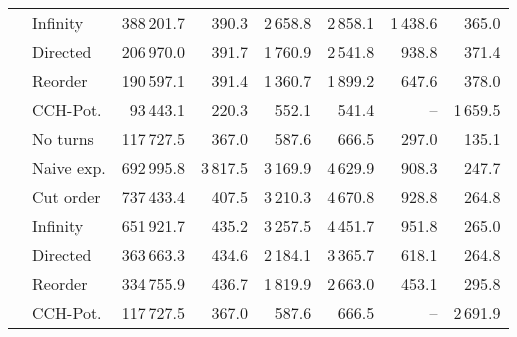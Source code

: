 \begin{tabular}{llrrrrrr}
       & Infinity &                 388\,201.7 &           390.3 &                                     2\,658.8 &                                       2\,858.1 & 1\,438.6 &  365.0 \\
       & Directed &                 206\,970.0 &           391.7 &                                     1\,760.9 &                                       2\,541.8 &  938.8 &  371.4 \\
       & Reorder &                 190\,597.1 &           391.4 &                                     1\,360.7 &                                       1\,899.2 &  647.6 &  378.0 \\
       & CCH-Pot. &                  93\,443.1 &           220.3 &                                      552.1 &                                        541.4 &    -- & 1\,659.5 \\
\addlinespace
\multirow{7}{*}{\rotatebox[origin=c]{90}{Europe}} & No turns &                 117\,727.5 &           367.0 &                                      587.6 &                                        666.5 &  297.0 &  135.1 \\
       & Naive exp. &                 692\,995.8 &          3\,817.5 &                                     3\,169.9 &                                       4\,629.9 &  908.3 &  247.7 \\
       & Cut order &                 737\,433.4 &           407.5 &                                     3\,210.3 &                                       4\,670.8 &  928.8 &  264.8 \\
       & Infinity &                 651\,921.7 &           435.2 &                                     3\,257.5 &                                       4\,451.7 &  951.8 &  265.0 \\
       & Directed &                 363\,663.3 &           434.6 &                                     2\,184.1 &                                       3\,365.7 &  618.1 &  264.8 \\
       & Reorder &                 334\,755.9 &           436.7 &                                     1\,819.9 &                                       2\,663.0 &  453.1 &  295.8 \\
       & CCH-Pot. &                 117\,727.5 &           367.0 &                                      587.6 &                                        666.5 &    -- & 2\,691.9 \\
\bottomrule
\end{tabular}
